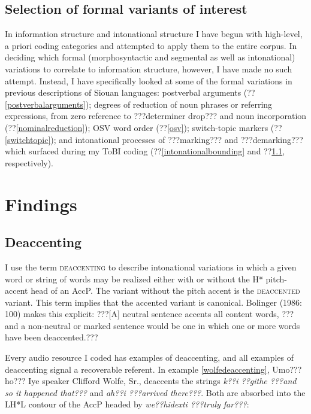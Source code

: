\documentclass[output=paper]{LSP/langsci}
\begin{document}
\subsection{Selection of formal variants of interest}\label{variantselection}

In information structure and intonational structure I have begun with high-level, a priori coding categories and attempted to apply them to the entire corpus. In deciding which formal (morphosyntactic and segmental as well as intonational) variations to correlate to information structure, however, I have made no such attempt. Instead, I have specifically looked at some of the formal variations in previous descriptions of Siouan languages: postverbal arguments (??\ref{postverbalarguments}); degrees of reduction of noun phrases or referring expressions, from zero reference to ???determiner drop??? and noun incorporation (??\ref{nominalreduction}); OSV word order (??\ref{osv}); switch-topic markers (??\ref{switchtopic}); and intonational processes of ???marking??? and ???demarking??? which surfaced during my ToBI coding (??\ref{intonationalbounding} and ??\ref{deaccenting}, respectively).

\section{Findings}\label{findings}

\subsection{Deaccenting}\label{deaccenting}

	I use the term \textsc{deaccenting} to describe intonational variations in which a given word or string of words may be realized either with or without the H* pitch-accent head of an AccP. The variant without the pitch accent is the \textsc{deaccented} variant. This term implies that the accented variant is canonical. Bolinger (1986: 100) makes this explicit: ???[A] neutral sentence accents all content words, ??? and a non-neutral or marked sentence would be one in which one or more words have been deaccented.???
	
Every audio resource I coded has examples of deaccenting, and all examples of deaccenting signal a recoverable referent. In example \ref{wolfedeaccenting}, Umo???ho??? Iye speaker Clifford Wolfe, Sr., deaccents the strings \textit{k??i ??githe ???and so it happened that???} and \textit{ah??i ???arrived there???}. Both are absorbed into the LH*L contour of the AccP headed by \textit{we??hidexti ???truly far???}:
\end{document}

